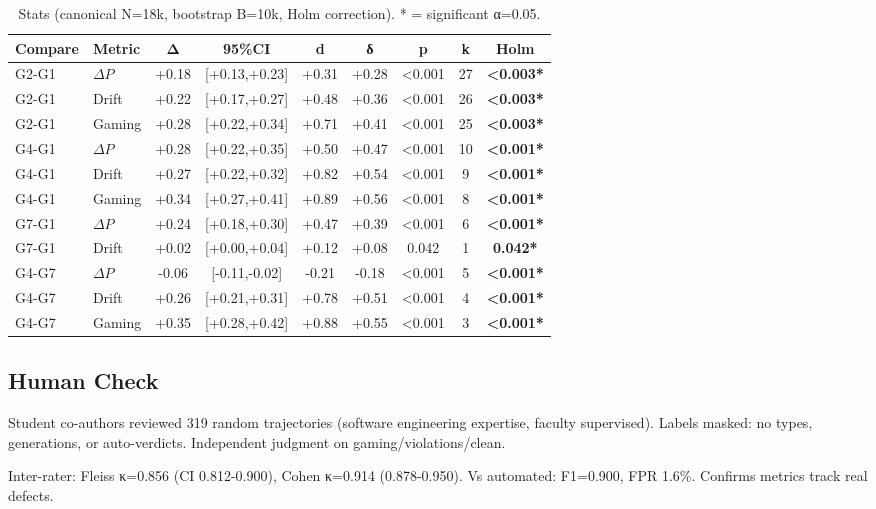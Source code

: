 \documentclass[conference]{IEEEtran}
\begin{document}
\begin{table}[t]
\centering
\small
\caption{Stats (canonical N=18k, bootstrap B=10k, Holm correction). * = significant α=0.05.}
\label{tab:significance_testing}
\begin{tabular}{llccccccc}
\toprule
\textbf{Compare} & \textbf{Metric} & \textbf{Δ} & \textbf{95\%CI} & \textbf{d} & \textbf{δ} & \textbf{p} & \textbf{k} & \textbf{Holm} \\
\midrule
G2-G1 & $\Delta P$ & +0.18 & [+0.13,+0.23] & +0.31 & +0.28 & <0.001 & 27 & \textbf{<0.003*} \\
G2-G1 & Drift & +0.22 & [+0.17,+0.27] & +0.48 & +0.36 & <0.001 & 26 & \textbf{<0.003*} \\
G2-G1 & Gaming & +0.28 & [+0.22,+0.34] & +0.71 & +0.41 & <0.001 & 25 & \textbf{<0.003*} \\
G4-G1 & $\Delta P$ & +0.28 & [+0.22,+0.35] & +0.50 & +0.47 & <0.001 & 10 & \textbf{<0.001*} \\
G4-G1 & Drift & +0.27 & [+0.22,+0.32] & +0.82 & +0.54 & <0.001 & 9 & \textbf{<0.001*} \\
G4-G1 & Gaming & +0.34 & [+0.27,+0.41] & +0.89 & +0.56 & <0.001 & 8 & \textbf{<0.001*} \\
G7-G1 & $\Delta P$ & +0.24 & [+0.18,+0.30] & +0.47 & +0.39 & <0.001 & 6 & \textbf{<0.001*} \\
G7-G1 & Drift & +0.02 & [+0.00,+0.04] & +0.12 & +0.08 & 0.042 & 1 & \textbf{0.042*} \\
G4-G7 & $\Delta P$ & -0.06 & [-0.11,-0.02] & -0.21 & -0.18 & <0.001 & 5 & \textbf{<0.001*} \\
G4-G7 & Drift & +0.26 & [+0.21,+0.31] & +0.78 & +0.51 & <0.001 & 4 & \textbf{<0.001*} \\
G4-G7 & Gaming & +0.35 & [+0.28,+0.42] & +0.88 & +0.55 & <0.001 & 3 & \textbf{<0.001*} \\
\bottomrule
\end{tabular}
\end{table}

\subsection{Human Check}

Student co-authors reviewed 319 random trajectories (software engineering expertise, faculty supervised). Labels masked: no types, generations, or auto-verdicts. Independent judgment on gaming/violations/clean.

Inter-rater: Fleiss κ=0.856 (CI 0.812-0.900), Cohen κ=0.914 (0.878-0.950). Vs automated: F1=0.900, FPR 1.6\%. Confirms metrics track real defects.
\end{document}
